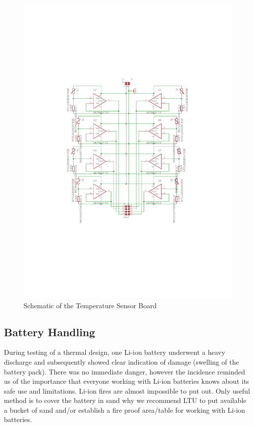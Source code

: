 \begin{figure}[H]
\centering
\includegraphics[width=\textwidth]{figures/fig_Schematic_TS}
\caption{Schematic of the Temperature Sensor Board}
\label{fig:Schematic_TS}
\end{figure}
%
%
\subsection*{Battery Handling}
%
%
During testing of a thermal design, one Li-ion battery underwent a heavy discharge and subsequently showed clear indication of damage (swelling of the battery pack). There was no immediate danger, however the incidence reminded us of the importance that everyone working with Li-ion batteries knows about its safe use and limitations. Li-ion fires are almost impossible to put out. Only useful method is to cover the battery in sand why we recommend LTU to put available a bucket of sand and/or establish a fire proof area/table for working with Li-ion batteries.
%
